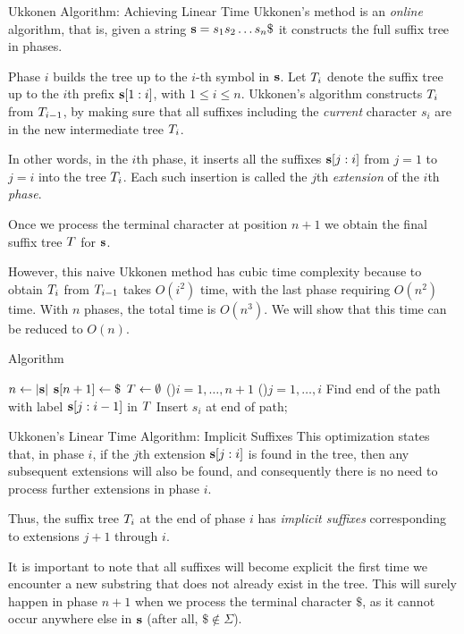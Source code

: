 \begin{frame}{Ukkonen Algorithm: Achieving Linear Time}
Ukkonen's method is an {\em online} algorithm, that is,
given a string $\bs = s_1s_2\ldots s_{n}\$$ it constructs the full
suff\/{i}x tree in phases. 

\medskip
Phase $i$ builds the tree up to the $i$-th symbol
in $\mathbf{s}$.
Let ${\relax T}_{i}$ denote the
suff\/{i}x tree up to the $i$th pref\/{i}x $\mathbf{s}[1:i]$, with $1 \le i \le
n$. Ukkonen's algorithm constructs ${\relax T}_i$ from
${\relax T}_{i-1}$, by making sure
that all suff\/{i}xes including the {\em current} character $s_{i}$ are in
the new intermediate tree ${\relax T}_{i}$. 

\medskip
In other words, in the $i$th
phase, it inserts all the suff\/{i}xes $\mathbf{s}[j:i]$ from $j=1$ to
$j=i$ into the tree ${\relax T}_{i}$. Each such insertion is called the $j$th
{\em extension} of the $i$th {\em phase}.

\medskip
Once we process the terminal
character at position $n+1$ we obtain the f\/{i}nal suff\/{i}x tree $\cT$
for $\mathbf{s}$.


\medskip
However, this naive Ukkonen method has cubic time complexity
because to obtain ${\relax T}_i$ from ${\relax T}_{i-1}$ takes $O(i^2)$ time,
with the last phase requiring $O(n^2)$ time. With
$n$ phases, the total time is $O(n^3)$.
We will show that this time can be reduced to $O(n)$.

\end{frame}


\begin{frame}[fragile]{Algorithm \algUkkonenSimple}
\begin{algorithm}[H]
 \AlgorithmU{}
$n \gets |\mathbf{s}|$\; $\bs[n+1] \gets \$$ 
${\relax T} \leftarrow \emptyset$ 
\ForEach(){$i=1,\ldots,n+1$}{
  \ForEach(){$j=1,\ldots,i$}{
    F{i}nd end of the path with label $\mathbf{s}[j:i-1]$ in $\cT$\;
    Insert $s_i$ at end of path;
  }
}
\Return{$\cT$}\;
\end{algorithm}
\end{frame}

\begin{frame}{Ukkonen's Linear Time Algorithm: Implicit Suffixes}
This optimization states that, in phase
$i$, if the $j$th extension $\mathbf{s}[j:i]$ is found in the tree, then any
subsequent extensions will also be found, and consequently there is
no need to process further extensions in phase $i$.

\bigskip
Thus, the suff\/{i}x tree ${\relax T}_i$ at the end of phase $i$ has
{\em implicit suff\/{i}xes} corresponding to extensions
$j+1$ through $i$.

\bigskip
It is important to note that all suff\/{i}xes will
become explicit the f\/{i}rst
time we encounter a new substring that does not already exist in the
tree. This will surely happen in phase $n+1$ when
we process the terminal character
$\$$, as it cannot occur anywhere else in
$\mathbf{s}$ (after all, $\$ \not\in \Sigma$).
\end{frame}





